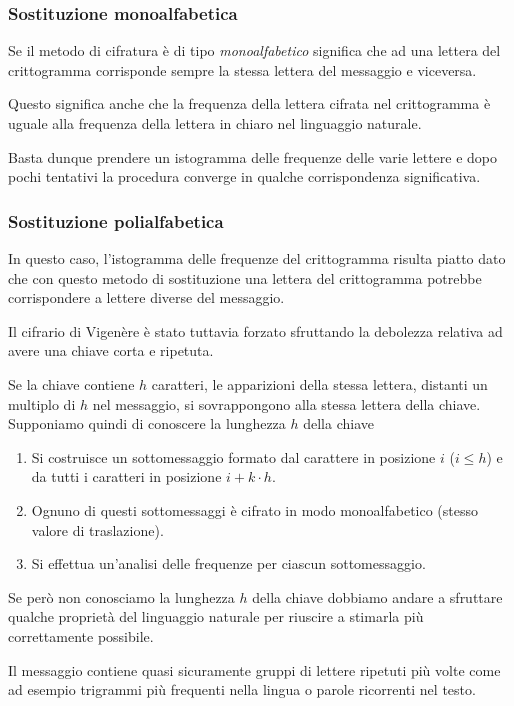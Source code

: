 \subsubsection{Sostituzione monoalfabetica}
Se il metodo di cifratura \`e di tipo \emph{monoalfabetico} significa che ad una lettera del crittogramma corrisponde
sempre la stessa lettera del messaggio e viceversa.

Questo significa anche che la frequenza della lettera cifrata nel crittogramma \`e uguale alla frequenza della lettera in
chiaro nel linguaggio naturale.

Basta dunque prendere un istogramma delle frequenze delle varie lettere e dopo pochi tentativi la procedura converge in
qualche corrispondenza significativa.

\subsubsection{Sostituzione polialfabetica}
In questo caso, l'istogramma delle frequenze del crittogramma risulta piatto dato che con questo metodo di sostituzione
una lettera del crittogramma potrebbe corrispondere a lettere diverse del messaggio.

Il cifrario di Vigen\`ere \`e stato tuttavia forzato sfruttando la debolezza relativa ad avere una chiave corta e ripetuta.

Se la chiave contiene $h$ caratteri, le apparizioni della stessa lettera, distanti un multiplo di $h$ nel messaggio, si
sovrappongono alla stessa lettera della chiave. Supponiamo quindi di conoscere la lunghezza $h$ della chiave
\begin{enumerate}
	\item Si costruisce un sottomessaggio formato dal carattere in posizione $i$ ($i \leq h$) e da tutti i caratteri
	      in posizione $i + k \cdot h$.
	\item Ognuno di questi sottomessaggi \`e cifrato in modo monoalfabetico (stesso valore di traslazione).
	\item Si effettua un'analisi delle frequenze per ciascun sottomessaggio.
\end{enumerate}

Se per\`o non conosciamo la lunghezza $h$ della chiave dobbiamo andare a sfruttare qualche propriet\`a del linguaggio
naturale per riuscire a stimarla pi\`u correttamente possibile.

Il messaggio contiene quasi sicuramente gruppi di lettere ripetuti pi\`u volte come ad esempio trigrammi pi\`u frequenti
nella lingua o parole ricorrenti nel testo.

